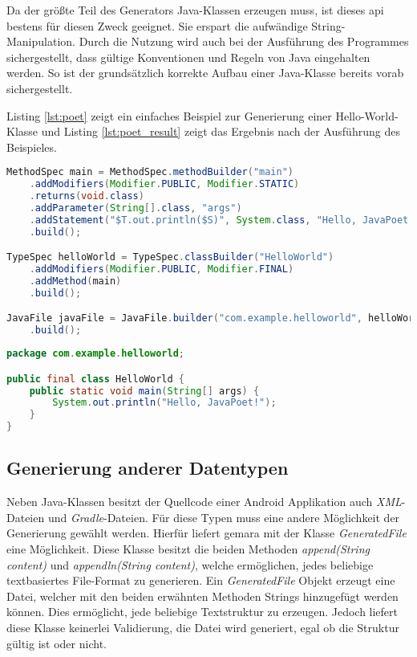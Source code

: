 Da der größte Teil des Generators Java-Klassen erzeugen muss, ist dieses \ac{api} bestens für diesen Zweck geeignet. Sie erspart die aufwändige String-Manipulation. Durch die Nutzung wird auch bei der Ausführung des Programmes sichergestellt, dass gültige Konventionen und Regeln von Java eingehalten werden. So ist der grundsätzlich korrekte Aufbau einer Java-Klasse bereits vorab sichergestellt.

Listing \ref{lst:poet} zeigt ein einfaches Beispiel zur Generierung einer Hello-World-Klasse und Listing \ref{lst:poet_result} zeigt das Ergebnis nach der Ausführung des Beispieles.

\begin{lstlisting}[label=lst:poet,
language=java,
firstnumber=1,
caption=Beispiel für die Generation einer Hallo-World-Klasse mit JavaPoet \cite{poet}.]				   
MethodSpec main = MethodSpec.methodBuilder("main")
	.addModifiers(Modifier.PUBLIC, Modifier.STATIC)
	.returns(void.class)
	.addParameter(String[].class, "args")
	.addStatement("$T.out.println($S)", System.class, "Hello, JavaPoet!")
	.build();

TypeSpec helloWorld = TypeSpec.classBuilder("HelloWorld")
	.addModifiers(Modifier.PUBLIC, Modifier.FINAL)
	.addMethod(main)
	.build();

JavaFile javaFile = JavaFile.builder("com.example.helloworld", helloWorld)
	.build();
\end{lstlisting}

\begin{lstlisting}[label=lst:poet_result,
language=java,
firstnumber=1,
caption=Ergebnis der Generation von Listing \ref{lst:poet} \cite{poet}.]				   
package com.example.helloworld;

public final class HelloWorld {
	public static void main(String[] args) {
		System.out.println("Hello, JavaPoet!");
	}
}
\end{lstlisting}

\subsection{Generierung anderer Datentypen}

Neben Java-Klassen besitzt der Quellcode einer Android Applikation auch \textit{XML}-Dateien und \textit{Gradle}-Dateien. Für diese Typen muss eine andere Möglichkeit der Generierung gewählt werden. Hierfür liefert \acf{gemara} mit der Klasse \textit{GeneratedFile} eine Möglichkeit. Diese Klasse besitzt die beiden Methoden \textit{append(String content)} und \textit{appendln(String content)}, welche ermöglichen, jedes beliebige textbasiertes File-Format zu generieren. Ein \textit{GeneratedFile} Objekt erzeugt eine Datei, welcher mit den beiden erwähnten Methoden Strings hinzugefügt werden können. Dies ermöglicht, jede beliebige Textstruktur zu erzeugen. Jedoch liefert diese Klasse keinerlei Validierung, die Datei wird generiert, egal ob die Struktur gültig ist oder nicht.

